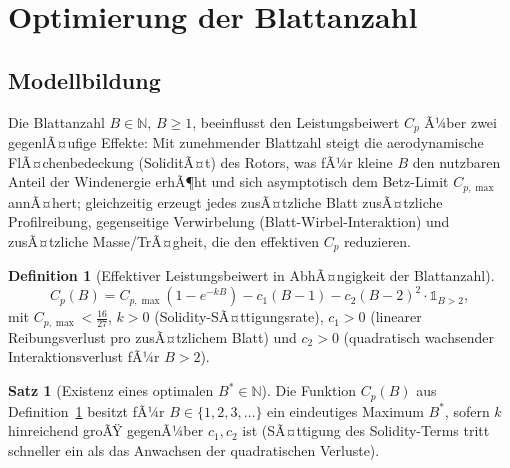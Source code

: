 ﻿\documentclass[a4paper,12pt]{article}
\theoremstyle{definition}
\newtheorem{definition}{Definition}
\newtheorem{satz}{Satz}
\begin{document}
\section{Optimierung der Blattanzahl}

\subsection{Modellbildung}

Die Blattanzahl $B \in \mathbb{N}$, $B\ge1$, beeinflusst den Leistungsbeiwert $C_p$ Ã¼ber zwei gegenlÃ¤ufige Effekte: Mit zunehmender Blattzahl steigt die aerodynamische FlÃ¤chenbedeckung (SoliditÃ¤t) des Rotors, was fÃ¼r kleine $B$ den nutzbaren Anteil der Windenergie erhÃ¶ht und sich asymptotisch dem Betz-Limit $C_{p,\max}$ annÃ¤hert; gleichzeitig erzeugt jedes zusÃ¤tzliche Blatt zusÃ¤tzliche Profilreibung, gegenseitige Verwirbelung (Blatt-Wirbel-Interaktion) und zusÃ¤tzliche Masse/TrÃ¤gheit, die den effektiven $C_p$ reduzieren.

\begin{definition}[Effektiver Leistungsbeiwert in AbhÃ¤ngigkeit der Blattanzahl]
\label{def:cpB}
\[
C_p(B) = C_{p,\max}\left(1 - e^{-kB}\right) - c_1(B-1) - c_2 (B-2)^2 \cdot \mathbb{1}_{B>2},
\]
mit $C_{p,\max}<\tfrac{16}{27}$, $k>0$ (Solidity-SÃ¤ttigungsrate), $c_1>0$ (linearer Reibungsverlust pro zusÃ¤tzlichem Blatt) und $c_2>0$ (quadratisch wachsender Interaktionsverlust fÃ¼r $B>2$).
\end{definition}

\begin{satz}[Existenz eines optimalen $B^*\in\mathbb{N}$]
\label{satz:blattzahl}
Die Funktion $C_p(B)$ aus Definition~\ref{def:cpB} besitzt fÃ¼r $B\in\{1,2,3,\ldots\}$ ein eindeutiges Maximum $B^*$, sofern $k$ hinreichend groÃŸ gegenÃ¼ber $c_1,c_2$ ist (SÃ¤ttigung des Solidity-Terms tritt schneller ein als das Anwachsen der quadratischen Verluste).
\end{satz}
\end{document}
